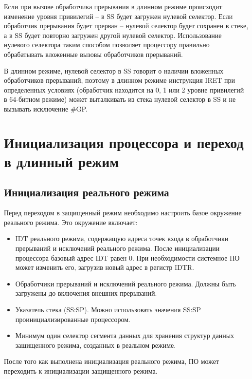 Если при вызове обработчика прерывания в длинном режиме происходит изменение
уровня привилегий -- в SS будет загружен нулевой селектор. Если обработчик
прерывания будет прерван -- нулевой селектор будет сохранен в стеке, а в SS
будет повторно загружен другой нулевой селектор. Использование нулевого
селектора таким способом позволяет процессору правильно обрабатывать вложенные
вызовы обработчиков прерываний.

В длинном режиме, нулевой селектор в SS говорит о наличии вложенных обработчиков прерываний, поэтому
в длинном режиме инструкция IRET при определенных условиях (обработчик находится на 0, 1 или 2 уровне
привилегий в 64-битном режиме)  может выталкивать из стека нулевой селектор в SS и не вызывать исключение \#GP.

\section{Инициализация процессора и переход в длинный режим}
\label{sec:long_mode_activation}

\subsection{Инициализация реального режима}
Перед переходом в защищенный режим необходимо настроить базое окружение
реального режима. Это окружение включает:
\begin{itemize}
\item IDT реального режима, содержащую адреса точек входа в обработчики прерываний
	и исключений реального режима. После инициализации процессора базовый адрес IDT
	равен 0. При необходимости системное ПО может изменить его, загрузив новый адрес
	в регистр IDTR.
\item Обработчики прерываний и исключений реального режима. Должны быть загружены до
	включения внешних прерываний.
\item Указатель стека (SS:SP). Можно использовать значения SS:SP проинициализированные процессором.
\item Минимум один селектор сегмента данных для хранения структур данных защищенного режима,
	созданных в реальном режиме.
\end{itemize}

После того как выполнена инициализация реального режима, ПО может переходить к
инициализации защищенного режима.

